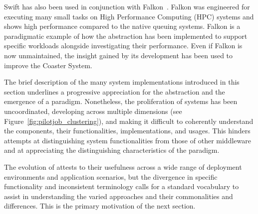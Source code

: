 \documentclass{sig-alternate}
\begin{document}
Swift has also been used in conjunction with Falkon~\cite{raicu2007falkon}.
Falkon was engineered for executing many small tasks on High Performance
Computing (HPC) systems and shows high performance compared to the native
queuing systems. Falkon is a paradigmatic example of how the \pilot abstraction
has been implemented to support specific workloads alongside investigating their
performance. Even if Falkon is now unmaintained, the insight gained by its
development has been used to improve the Coaster System.



The brief description of the many \pilotjob system implementations introduced in
this section underlines a progressive appreciation for the \pilot abstraction
and the emergence of a \pilot paradigm. Nonetheless, the proliferation of
\pilotjob systems has been uncoordinated, developing across multiple dimensions
(see Figure~\ref{fig:pilotjob_clustering}), and making it difficult to
coherently understand the \pilot components, their functionalities,
implementations, and usages. This hinders attempts at distinguishing \pilotjob
system functionalities from those of other middleware and at appreciating the
distinguishing characteristics of the \pilot paradigm.




The evolution of \pilots attests to their usefulness across a wide range of
deployment environments and application scenarios, but the divergence in
specific functionality and inconsistent terminology calls for a standard
vocabulary to assist in understanding the varied approaches and their
commonalities and differences. This is the primary motivation of the next
section.
\end{document}
